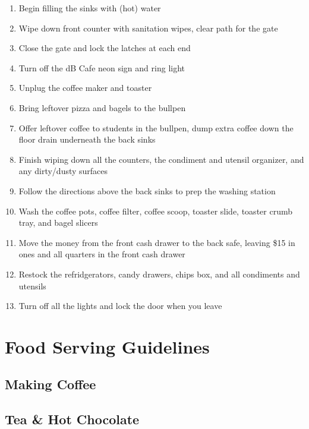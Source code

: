 \documentclass[12pt,onecolumn,letterpaper]{article}
\begin{document}
\begin{enumerate}
\item Begin filling the sinks with (hot) water 
\item Wipe down front counter with sanitation wipes, clear path for the gate
\item Close the gate and lock the latches at each end
\item Turn off the dB Cafe neon sign and ring light
\item Unplug the coffee maker and toaster
\item Bring leftover pizza and bagels to the bullpen
\item Offer leftover coffee to students in the bullpen, dump extra coffee down the floor drain underneath the back sinks
\item Finish wiping down all the counters, the condiment and utensil organizer, and any dirty/dusty surfaces
\item Follow the directions above the back sinks to prep the washing station
\item Wash the coffee pots, coffee filter, coffee scoop, toaster slide, toaster crumb tray, and bagel slicers
\item Move the money from the front cash drawer to the back safe, leaving \$15 in ones and all quarters in the front cash drawer
\item Restock the refridgerators, candy drawers, chips box, and all condiments and utensils
\item Turn off all the lights and lock the door when you leave
\end{enumerate}
\section{Food Serving Guidelines}
\subsection{Making Coffee}
\subsection{Tea \& Hot Chocolate}
\end{document}

